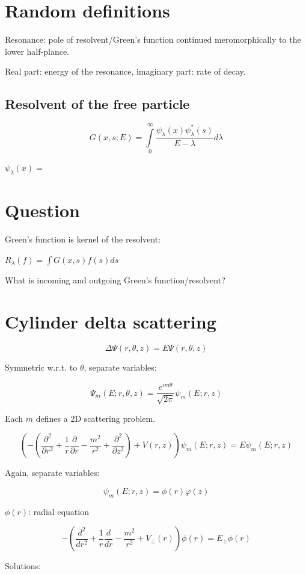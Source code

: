 \documentclass[12pt, a4paper]{article}
\begin{document}
\section{Random definitions}
Resonance: pole of resolvent/Green's function continued meromorphically to the lower half-plance.

Real part: energy of the resonance, imaginary part: rate of decay.

\subsection{Resolvent of the free particle}
$$G(x, s; E) = \int\limits_{0}^{\infty} \frac{\psi_\lambda(x) \psi_\lambda^*(s)}{E - \lambda} d \lambda$$

$\psi_\lambda(x) = $

\section{Question}
Green's function is kernel of the resolvent:

$R_\lambda(f) = \int G(x, s) f(s) ds$

What is incoming and outgoing Green's function/resolvent?

\section{Cylinder delta scattering}

$$\Delta \Psi(r, \theta, z) = E \Psi(r, \theta, z)$$

Symmetric w.r.t. to $\theta$, separate variables:

$$\Psi_m(E; r, \theta, z) = \frac{e^{i m \theta}}{\sqrt{2 \pi}} \psi_m(E; r, z)$$

Each $m$ defines a 2D scattering problem.

$$\left( - \left( \frac{\partial^2}{\partial r^2} + \frac{1}{r} \frac{\partial}{\partial r} - \frac{m^2}{r^2} + \frac{\partial^2}{\partial z^2} \right) + V(r, z) \right) \psi_m(E; r, z) = E \psi_m(E; r, z)$$

Again, separate variables:

$$\psi_m(E; r, z) = \phi(r) \varphi(z)$$

$\phi(r)$: radial equation

$$- \left( \frac{d^2}{dr^2} + \frac{1}{r} \frac{d}{dr} - \frac{m^2}{r^2} + V_\perp(r) \right) \phi(r) = E_\perp \phi(r)$$

Solutions: 
\end{document}

